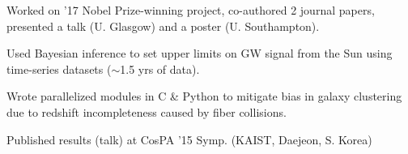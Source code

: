 \documentclass[]{deedy-resume-openfont}
\begin{document}
\begin{minipage}[t]{0.66\textwidth}
 \hfill {}

\begin{tightemize}
\item Worked on '17 Nobel Prize-winning project, co-authored 2 journal papers, presented a talk (U. Glasgow) and a poster (U. Southampton).\item Used Bayesian inference to set upper limits on GW signal from the Sun using time-series datasets ($\sim$1.5 yrs of data). \end{tightemize}
\sectionsep

 \hfill  {}


\begin{tightemize}
\item Wrote parallelized modules in C \& Python to mitigate bias in galaxy clustering due to redshift incompleteness caused by fiber collisions. \item Published results (talk) at CosPA '15 Symp. (KAIST, Daejeon, S. Korea) \end{tightemize}
\sectionsep
\end{minipage} 


\end{document}

